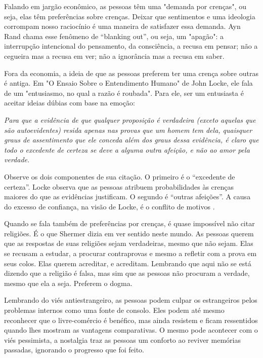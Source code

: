 Falando em jargão econômico, as pessoas têm uma "demanda por crenças", ou seja, elas têm preferências sobre crenças. Deixar que sentimentos e uma ideologia corrompam nosso raciocínio é uma maneira de satisfazer essa demanda. Ayn Rand chama esse fenômeno de “blanking out”, ou seja, um "apagão": a interrupção intencional do pensamento, da consciência, a recusa em pensar; não a cegueira mas a recusa em ver; não a ignorância mas a recusa em saber.

Fora da economia, a ideia de que as pessoas preferem ter uma crença sobre outras é antiga. Em "O Ensaio Sobre o Entendimento Humano" de John Locke, ele fala de um "entusiasmo, no qual a razão é roubada". Para ele, ser um entusiasta é aceitar ideias dúbias com base na emoção:

\begin{citacao}
    \textit{
        Para que a evidência de que qualquer proposição é verdadeira (exceto aquelas que são autoevidentes) resida apenas nas provas que um homem tem dela, quaisquer graus de assentimento que ele conceda além dos graus dessa evidência, é claro que todo o excedente de certeza se deve a alguma outra afeição, e não ao amor pela verdade.
    } \newline
    \cite{locke2014ensaio}
\end{citacao}

Observe os dois componentes de sua citação. O primeiro é o “excedente de certeza”. Locke observa que as pessoas atribuem probabilidades às crenças maiores do que as evidências justificam. O segundo é “outras afeições”. A causa do excesso de confiança, na visão de Locke, é o conflito de motivos \cite{The_Myth_of_the_Rational_Voter}. 

Quando se fala também de preferências por crenças, é quase impossível não citar religiões. É o que Shermer dizia em ver sentido neste mundo. As pessoas querem que as respostas de suas religiões sejam verdadeiras, mesmo que não sejam. Elas se recusam a estudar, a procurar contraprovas e mesmo a refletir com a prova em seus colos. Elas querem acreditar, e acreditam. Lembrando que aqui não se está dizendo que a religião é falsa, mas sim que as pessoas  não procuram a verdade, mesmo que ela a seja. Preferem o dogma.

Lembrando do viés antiestrangeiro, as pessoas podem culpar os estrangeiros pelos problemas internos como uma fonte de consolo. Eles podem até mesmo reconhecer que o livre-comércio é benéfico, mas ainda resistem e ficam ressentidos quando lhes mostram as vantagens comparativas. O mesmo pode acontecer com o viés pessimista, a nostalgia traz as pessoas um conforto ao reviver memórias passadas, ignorando o progresso que foi feito.

